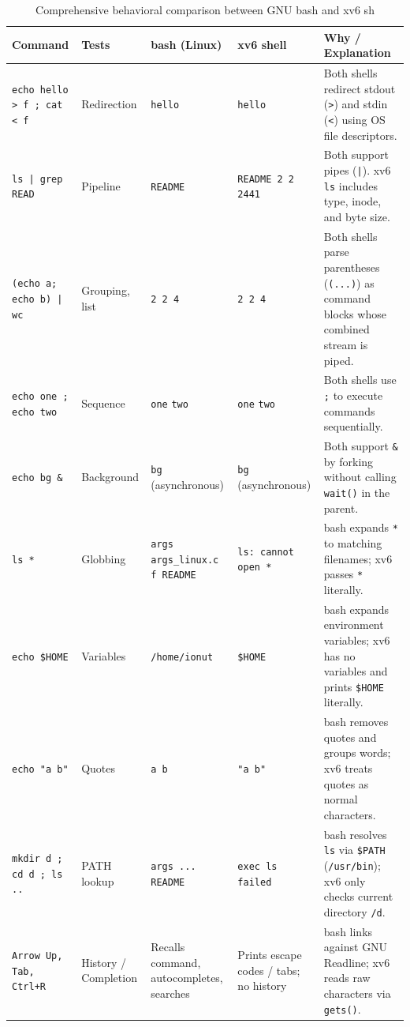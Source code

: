 \documentclass{labreport}
\begin{document}
\newpage
\begin{table}[htbp]
\centering
\footnotesize
\renewcommand{\arraystretch}{1.12}
\setlength{\tabcolsep}{4pt}
\begin{tabularx}{\textwidth}{p{3.4cm} p{2.0cm} p{2.5cm} p{2.5cm} X}
\toprule
\textbf{Command} & \textbf{Tests} & \textbf{bash (Linux)} & \textbf{xv6 shell} & \textbf{Why / Explanation} \\
\midrule
\texttt{echo hello > f ; cat < f} & Redirection & \texttt{hello} & \texttt{hello} & Both shells redirect stdout (\texttt{>}) and stdin (\texttt{<}) using OS file descriptors. \\
\addlinespace
\texttt{ls | grep READ} & Pipeline & \texttt{README} & \texttt{README 2 2 2441} & Both support pipes (\texttt{|}). xv6 \texttt{ls} includes type, inode, and byte size. \\
\addlinespace
\texttt{(echo a; echo b) | wc} & Grouping, list & \texttt{2 2 4} & \texttt{2 2 4} & Both shells parse parentheses (\texttt{(...)}) as command blocks whose combined stream is piped. \\
\addlinespace
\texttt{echo one ; echo two} & Sequence & \texttt{one} \newline \texttt{two} & \texttt{one} \newline \texttt{two} & Both shells use \texttt{;} to execute commands sequentially. \\
\addlinespace
\texttt{echo bg \&} & Background & \texttt{bg} (asynchronous) & \texttt{bg} (asynchronous) & Both support \texttt{\&} by forking without calling \texttt{wait()} in the parent. \\
\addlinespace
\texttt{ls *} & Globbing & \texttt{args args\_linux.c f README} & \texttt{ls: cannot open *} & bash expands \texttt{*} to matching filenames; xv6 passes \texttt{*} literally. \\
\addlinespace
\texttt{echo \$HOME} & Variables & \texttt{/home/ionut} & \texttt{\$HOME} & bash expands environment variables; xv6 has no variables and prints \texttt{\$HOME} literally. \\
\addlinespace
\texttt{echo "a b"} & Quotes & \texttt{a b} & \texttt{"a b"} & bash removes quotes and groups words; xv6 treats quotes as normal characters. \\
\addlinespace
\texttt{mkdir d ; cd d ; ls ..} & PATH lookup & \texttt{args ... README} & \texttt{exec ls failed} & bash resolves \texttt{ls} via \texttt{\$PATH} (\texttt{/usr/bin}); xv6 only checks current directory \texttt{/d}. \\
\addlinespace
\texttt{Arrow Up, Tab, Ctrl+R} & History / Completion & Recalls command, autocompletes, searches & Prints escape codes / tabs; no history & bash links against GNU Readline; xv6 reads raw characters via \texttt{gets()}. \\
\bottomrule
\end{tabularx}
\caption{Comprehensive behavioral comparison between GNU bash and xv6 sh}
\end{table}
\end{document}
